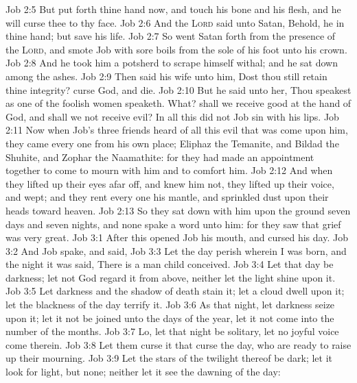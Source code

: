 \vs Job 2:5 But put forth thine hand now, and touch his bone and his flesh, and he will curse thee to thy face.
\vs Job 2:6 And the \textsc{Lord} said unto Satan, Behold, he  in thine hand; but save his life.
\vs Job 2:7 So went Satan forth from the presence of the \textsc{Lord}, and smote Job with sore boils from the sole of his foot unto his crown.
\vs Job 2:8 And he took him a potsherd to scrape himself withal; and he sat down among the ashes.
\vs Job 2:9 Then said his wife unto him, Dost thou still retain thine integrity? curse God, and die.
\vs Job 2:10 But he said unto her, Thou speakest as one of the foolish women speaketh. What? shall we receive good at the hand of God, and shall we not receive evil? In all this did not Job sin with his lips.
\vs Job 2:11 Now when Job's three friends heard of all this evil that was come upon him, they came every one from his own place; Eliphaz the Temanite, and Bildad the Shuhite, and Zophar the Naamathite: for they had made an appointment together to come to mourn with him and to comfort him.
\vs Job 2:12 And when they lifted up their eyes afar off, and knew him not, they lifted up their voice, and wept; and they rent every one his mantle, and sprinkled dust upon their heads toward heaven.
\vs Job 2:13 So they sat down with him upon the ground seven days and seven nights, and none spake a word unto him: for they saw that  grief was very great.
\vs Job 3:1 After this opened Job his mouth, and cursed his day.
\vs Job 3:2 And Job spake, and said,
\vs Job 3:3 Let the day perish wherein I was born, and the night  it was said, There is a man child conceived.
\vs Job 3:4 Let that day be darkness; let not God regard it from above, neither let the light shine upon it.
\vs Job 3:5 Let darkness and the shadow of death stain it; let a cloud dwell upon it; let the blackness of the day terrify it.
\vs Job 3:6 As  that night, let darkness seize upon it; let it not be joined unto the days of the year, let it not come into the number of the months.
\vs Job 3:7 Lo, let that night be solitary, let no joyful voice come therein.
\vs Job 3:8 Let them curse it that curse the day, who are ready to raise up their mourning.
\vs Job 3:9 Let the stars of the twilight thereof be dark; let it look for light, but  none; neither let it see the dawning of the day:
